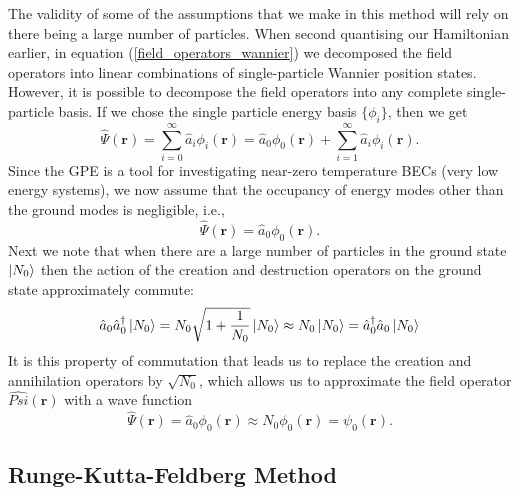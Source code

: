 \documentclass[a4paper, 10pt]{article}
\theoremstyle{plain}
\begin{document}
The validity of some of the assumptions that we make in this method will rely on
there being a large number of particles. When second quantising our Hamiltonian
earlier, in equation (\ref{field_operators_wannier}) we decomposed the field
operators into linear combinations of single-particle Wannier position states.
However, it is possible to decompose the field operators into any complete
single-particle basis. If we chose the single particle energy basis $\lbrace
\phi_{i} \rbrace$, then we get
\begin{equation}
    \hat{\Psi}(\mathbf{r})
    =
    \sum_{i=0}^{\infty}{\hat{a}_i\phi_{i}(\mathbf{r})}
    =
    \hat{a}_{0} \phi_{0}(\mathbf{r}) +
    \sum_{i=1}^{\infty}{\hat{a}_i\phi_{i}(\mathbf{r})}.
\end{equation}
Since the GPE is a tool for investigating near-zero temperature BECs (very low
energy systems), we now assume that the occupancy of energy modes other than
the ground modes is negligible, i.e.,
\begin{equation}
    \hat{\Psi}(\mathbf{r}) = \hat{a}_{0} \phi_{0}(\mathbf{r}).
\end{equation}
Next we note that when there are a large number of particles in the ground state
$\ket{N_{0}}$ then the action of the creation and destruction operators on the
ground state approximately commute:
\begin{equation}
    \hat{a}_{0} \hat{a}^{\dagger}_{0} \ket{N_{0}}
    =
    N_{0} \sqrt{1+\frac{1}{N_{0}}} \ket{N_{0}}
    \approx
    N_{0} \ket{N_{0}}
    =
    \hat{a}^{\dagger}_{0} \hat{a}_{0} \ket{N_{0}}
\end{equation}
It is this property of commutation that leads us to replace the creation and
annihilation operators by $\sqrt{N_{0}}$, which allows us to approximate the
field operator $\hat{Psi}(\mathbf{r})$ with a wave function
\begin{equation}
    \hat{\Psi}(\mathbf{r})
    =
    \hat{a}_{0} \phi_{0}(\mathbf{r}) \approx N_{0} \phi_{0}(\mathbf{r})
    =
    \psi_{0}(\mathbf{r}).
\end{equation}


\subsection{Runge-Kutta-Feldberg Method}
\end{document}
